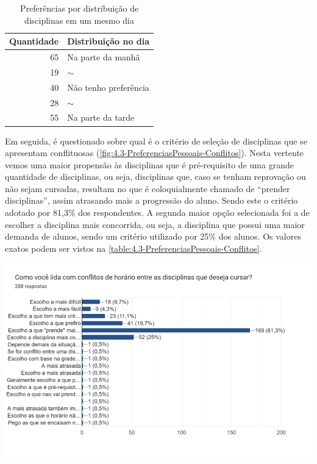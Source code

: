 \begin{table}[htbp]\centering
  \caption{Preferências por distribuição de disciplinas em um mesmo dia}
  \label{table:4.2-PreferenciasPessoais-Manha_Tarde}
  \begin{tabular}{| r l |}
    \hline
    \textbf{Quantidade} & \textbf{Distribuição no dia} \\
    \hline
    65                  & Na parte da manhã            \\
    19                  & $\sim$                       \\
    40                  & Não tenho preferência        \\
    28                  & $\sim$                       \\
    55                  & Na parte da tarde            \\
    \hline
  \end{tabular}
\end{table}

Em seguida, é questionado sobre qual é o critério de seleção de disciplinas que se apresentam conflituosas (\autoref{fig:4.3-PreferenciasPessoais-Conflitos}). Nesta vertente vemos uma maior propensão às disciplinas que é pré-requisito de uma grande quantidade de disciplinas, ou seja, disciplinas que, caso se tenham reprovação ou não sejam cursadas, resultam no que é coloquialmente chamado de ``prender disciplinas'', assim atrasando mais a progressão do aluno. Sendo este o critério adotado por 81,3\% dos respondentes. A segunda maior opção selecionada foi a de escolher a disciplina mais concorrida, ou seja, a disciplina que possui uma maior demanda de alunos, sendo um critério utilizado por 25\% dos alunos. Os valores exatos podem ser vistos na \autoref{table:4.3-PreferenciasPessoais-Conflitos}.

\begin{MyCenteredFigure}
  \caption{Critérios para a escolha de disciplinas conflituosas}
  \label{fig:4.3-PreferenciasPessoais-Conflitos}
  \includegraphics[width=\textwidth]{files/img/2.02!3-organizacao/2.02!3.1.4-forms/4.3-PreferenciasPessoais-Conflitos}
\end{MyCenteredFigure} %

